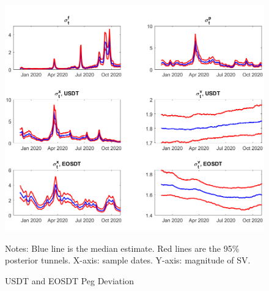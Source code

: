 \documentclass[12pt]{article}
\begin{document}
\begin{figure}
	\centering
	\caption{USDT and EOSDT Peg Deviation}
	\includegraphics[width=1\textwidth]{SV}
	\label{sv}
		\begin{minipage}{1\textwidth} %
		{\footnotesize Notes: Blue line is the median estimate. Red lines are the 95\% posterior tunnels. X-axis: sample dates. Y-axis: magnitude of SV.\par}
	\end{minipage}
\end{figure}
\end{document}
